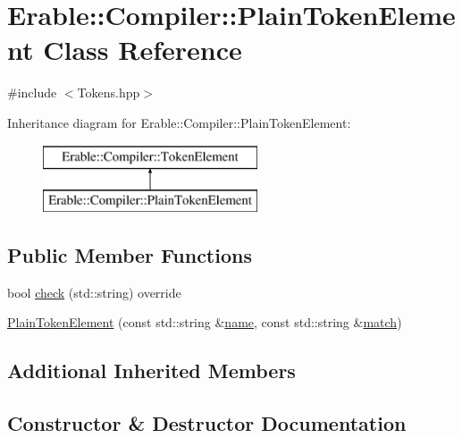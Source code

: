 \hypertarget{class_erable_1_1_compiler_1_1_plain_token_element}{}\section{Erable\+::Compiler\+::Plain\+Token\+Element Class Reference}
\label{class_erable_1_1_compiler_1_1_plain_token_element}


{\ttfamily \#include $<$Tokens.\+hpp$>$}

Inheritance diagram for Erable\+::Compiler\+::Plain\+Token\+Element\+:\begin{figure}[H]
\begin{center}
\leavevmode
\includegraphics[height=2.000000cm]{class_erable_1_1_compiler_1_1_plain_token_element}
\end{center}
\end{figure}
\subsection*{Public Member Functions}
\begin{DoxyCompactItemize}
\item 
bool \mbox{\hyperlink{class_erable_1_1_compiler_1_1_plain_token_element_a84f12d7d773c70712b30827eae60caed}{check}} (std\+::string) override
\item 
\mbox{\hyperlink{class_erable_1_1_compiler_1_1_plain_token_element_a0f32e55fa7c7f29000fede415c664af6}{Plain\+Token\+Element}} (const std\+::string \&\mbox{\hyperlink{class_erable_1_1_compiler_1_1_token_element_aeeb8454fbc160978c6fcb27b77ff9d90}{name}}, const std\+::string \&\mbox{\hyperlink{class_erable_1_1_compiler_1_1_token_element_acae3d5d6e860524271a0f164bbd25d83}{match}})
\end{DoxyCompactItemize}
\subsection*{Additional Inherited Members}


\subsection{Constructor \& Destructor Documentation}
\mbox{\label{class_erable_1_1_compiler_1_1_plain_token_element_a0f32e55fa7c7f29000fede415c664af6}} 
